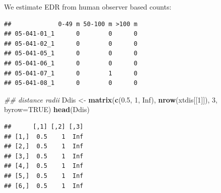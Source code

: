 \documentclass[12pt,]{book}
\newenvironment{Shaded}{\begin{snugshade}}{\end{snugshade}}
\newcommand{\CommentTok}[1]{\textcolor[rgb]{0.56,0.35,0.01}{\textit{#1}}}
\newcommand{\ControlFlowTok}[1]{\textcolor[rgb]{0.13,0.29,0.53}{\textbf{#1}}}
\newcommand{\DataTypeTok}[1]{\textcolor[rgb]{0.13,0.29,0.53}{#1}}
\newcommand{\DecValTok}[1]{\textcolor[rgb]{0.00,0.00,0.81}{#1}}
\newcommand{\FloatTok}[1]{\textcolor[rgb]{0.00,0.00,0.81}{#1}}
\newcommand{\KeywordTok}[1]{\textcolor[rgb]{0.13,0.29,0.53}{\textbf{#1}}}
\newcommand{\NormalTok}[1]{#1}
\newcommand{\OperatorTok}[1]{\textcolor[rgb]{0.81,0.36,0.00}{\textbf{#1}}}
\newcommand{\OtherTok}[1]{\textcolor[rgb]{0.56,0.35,0.01}{#1}}
\newcommand{\StringTok}[1]{\textcolor[rgb]{0.31,0.60,0.02}{#1}}
\begin{document}
We estimate EDR from human observer based counts:

\begin{Shaded}
\end{Shaded}

\begin{verbatim}
##             0-49 m 50-100 m >100 m
## 05-041-01_1      0        0      0
## 05-041-02_1      0        0      0
## 05-041-05_1      0        0      0
## 05-041-06_1      0        0      0
## 05-041-07_1      0        1      0
## 05-041-08_1      0        0      0
\end{verbatim}

\begin{Shaded}
\begin{Highlighting}[]
\CommentTok{## distance radii}
\NormalTok{Ddis <-}\StringTok{ }\KeywordTok{matrix}\NormalTok{(}\KeywordTok{c}\NormalTok{(}\FloatTok{0.5}\NormalTok{, }\DecValTok{1}\NormalTok{, }\OtherTok{Inf}\NormalTok{), }\KeywordTok{nrow}\NormalTok{(xtdis[[}\DecValTok{1}\NormalTok{]]), }\DecValTok{3}\NormalTok{, }\DataTypeTok{byrow=}\OtherTok{TRUE}\NormalTok{)}
\KeywordTok{head}\NormalTok{(Ddis)}
\end{Highlighting}
\end{Shaded}

\begin{verbatim}
##      [,1] [,2] [,3]
## [1,]  0.5    1  Inf
## [2,]  0.5    1  Inf
## [3,]  0.5    1  Inf
## [4,]  0.5    1  Inf
## [5,]  0.5    1  Inf
## [6,]  0.5    1  Inf
\end{verbatim}
\end{document}
